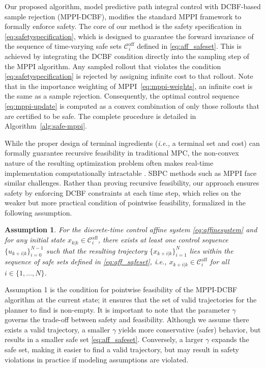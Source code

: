 \documentclass[letterpaper, 10 pt, conference]{ieeeconf}
\newtheorem{assumption}{Assumption}
\begin{document}
Our proposed algorithm, model predictive path integral control with DCBF-based sample rejection (MPPI-DCBF), modifies the standard MPPI framework to formally enforce safety. The core of our method is the safety specification in \eqref{eq:safetyspecification}, which is designed to guarantee the forward invariance of the sequence of time-varying safe sets $\mathcal{C}_i^{\mathrm{aff}}$ defined in \eqref{eq:aff_safeset}. This is achieved by integrating the DCBF condition directly into the sampling step of the MPPI algorithm. Any sampled rollout that violates the condition \eqref{eq:safetyspecification} is rejected by assigning infinite cost to that rollout. Note that in the importance weighting of MPPI~\eqref{eq:mppi-weights}, an infinite cost is the same as a sample rejection. Consequently, the optimal control sequence \eqref{eq:mppi-update} is computed as a convex combination of only those rollouts that are certified to be safe. The complete procedure is detailed in Algorithm~\ref{alg:safe-mppi}.

While the proper design of terminal ingredients (\textit{i.e.,} a terminal set and cost) can formally guarantee recursive feasibility in traditional MPC, the non-convex nature of the resulting optimization problem often makes real-time implementation computationally intractable \cite{rawlings2020model}. SBPC methods such as MPPI face similar challenges. Rather than proving recursive feasibility, our approach ensures safety by enforcing DCBF constraints at each time step, which relies on the weaker but more practical condition of pointwise feasibility, formalized in the following assumption.
\begin{assumption}  \label{assumption_1}
    For the discrete-time control affine system \eqref{eq:affinesystem} and for any initial state $x_{k|k} \in \mathcal{C}_i^\mathrm{aff}$, there exists at least one control sequence $\{u_{k+i|k}\}_{i=0}^{N-1}$ such that the resulting trajectory $\{x_{k+i|k}\}_{i=1}^{N}$ lies within the sequence of safe sets defined in \eqref{eq:aff_safeset}, i.e., $x_{k+i|k} \in \mathcal{C}_i^{\mathrm{aff}}$ for all $i \in \{1, \dots, N\}$.
\end{assumption}

Assumption 1 is the condition for pointwise feasibility of the MPPI-DCBF algorithm at the current state; it ensures that the set of valid trajectories for the planner to find is non-empty. It is important to note that the parameter $\gamma$ governs the trade-off between safety and feasibility. Although we assume there exists a valid trajectory, a smaller $\gamma$ yields more conservative (safer) behavior, but results in a smaller safe set \eqref{eq:aff_safeset}. Conversely, a larger $\gamma$ expands the safe set, making it easier to find a valid trajectory, but may result in safety violations in practice if modeling assumptions are violated. 
\end{document}
